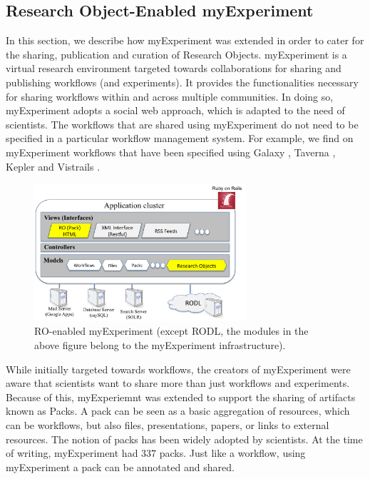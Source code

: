 \subsection{Research Object-Enabled myExperiment}
\label{sec:myexperiment}


In this section, we describe how myExperiment \cite{DBLP:journals/fgcs/RoureGS09} was extended in order to cater for the sharing, publication and curation of Research Objects. myExperiment is a virtual research environment targeted towards collaborations for sharing and publishing workflows (and experiments). It provides the functionalities necessary for sharing workflows within and across multiple communities. In doing so, myExperiment adopts a social web approach, which is adapted to the need of scientists. The workflows that are shared using myExperiment do not need to be specified in a particular workflow management system. For example, we find on myExperiment workflows that have been specified using Galaxy \cite{galaxy}, Taverna \cite{taverna}, Kepler \cite{kepler} and Vistrails \cite{vistrails}.

\begin{figure}
\begin{center}
\includegraphics[width=0.7\textwidth]{Figures/myexperimentArchitecture.png}
\end{center}
\caption{RO-enabled myExperiment (except RODL, the modules in the above figure belong to the myExperiment infrastructure).}
\label{fig:myexperimentarchitecture}
\end{figure}


While initially targeted towards workflows, the creators of myExperiment were aware that scientists want to share more than just workflows and experiments. Because of this, myExperiemnt was extended to support the sharing of artifacts known as Packs. A pack can be seen as a basic aggregation of resources, which can be workflows, but also files, presentations, papers, or links to external resources. 
The notion of packs has been widely adopted by scientists. At the time of writing, myExperiment had $337$ packs. Just like a workflow, using myExperiment a pack can be annotated and shared. 
 
